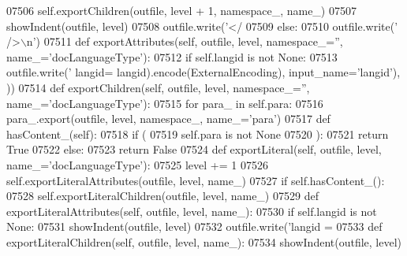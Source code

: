 \begin{DoxyCode}
{{{{{{{{{{{{{{{{{{{{{{{{{{{{{{{{{{{{{{{{{{{{{{{{{{{{{{{{{{{{{{{{{{{{{{{{{{{{{{{{{{{{{{{{{{{{{{{{{{{{{{{{{{{{{{{{{{{{{{{{{{{{{{{{{{{{{{{{{{{{{{{{{{{{{{{{{{{{{{{{{{{{{{{{{{{{{{{{{{{{{{{{{{{{{{{{{{{{{{{{{{{{{{{{{{{{{{{{{{{{{{{{{{{{{{{{{{{{{{{{{{{{{{{{{{{{{{{{{{{{{{{{{{{{{{{{{{{{{{{{{{{{{{{{{{{{{{{{{{{{{{{{{{{{{{{{{{{{{{{{{{{{{{{{{{{{{{{{{{{{{{{{{{{{{{{{{{{{{{{{{{{{{{{{{{{{{{{{{{{{{{{{{{{{{{{{{{{{{{{{{{{{{{{{{{{{{{{{{{{{{{{{{{{{{{{{{{{{{{{{{{{{{{{{{{{{{{{{{{{{{{{{{{{{{{{07506             self.exportChildren(outfile, level + 1, namespace\_, name\_)
07507             showIndent(outfile, level)
07508             outfile.write(\textcolor{stringliteral}{'</%
07509         \textcolor{keywordflow}{else}:
07510             outfile.write(\textcolor{stringliteral}{' />\(\backslash\)n'})
07511     \textcolor{keyword}{def }exportAttributes(self, outfile, level, namespace\_='', name\_='docLanguageType'):
07512         \textcolor{keywordflow}{if} self.langid \textcolor{keywordflow}{is} \textcolor{keywordflow}{not} \textcolor{keywordtype}{None}:
07513             outfile.write(\textcolor{stringliteral}{' langid=%
      langid).encode(ExternalEncoding), input\_name=\textcolor{stringliteral}{'langid'}), ))
07514     \textcolor{keyword}{def }exportChildren(self, outfile, level, namespace\_='', name\_='docLanguageType'):
07515         \textcolor{keywordflow}{for} para\_ \textcolor{keywordflow}{in} self.para:
07516             para\_.export(outfile, level, namespace\_, name\_=\textcolor{stringliteral}{'para'})
07517     \textcolor{keyword}{def }hasContent_(self):
07518         \textcolor{keywordflow}{if} (
07519             self.para \textcolor{keywordflow}{is} \textcolor{keywordflow}{not} \textcolor{keywordtype}{None}
07520             ):
07521             \textcolor{keywordflow}{return} \textcolor{keyword}{True}
07522         \textcolor{keywordflow}{else}:
07523             \textcolor{keywordflow}{return} \textcolor{keyword}{False}
07524     \textcolor{keyword}{def }exportLiteral(self, outfile, level, name\_='docLanguageType'):
07525         level += 1
07526         self.exportLiteralAttributes(outfile, level, name\_)
07527         \textcolor{keywordflow}{if} self.hasContent_():
07528             self.exportLiteralChildren(outfile, level, name\_)
07529     \textcolor{keyword}{def }exportLiteralAttributes(self, outfile, level, name\_):
07530         \textcolor{keywordflow}{if} self.langid \textcolor{keywordflow}{is} \textcolor{keywordflow}{not} \textcolor{keywordtype}{None}:
07531             showIndent(outfile, level)
07532             outfile.write(\textcolor{stringliteral}{'langid = %
07533     \textcolor{keyword}{def }exportLiteralChildren(self, outfile, level, name\_):
07534         showIndent(outfile, level)
}}}}}}}}}}}}}}}}}}}}}}}}}}}}}}}}}}}}}}}}}}}}}}}}}}}}}}}}}}}}}}}}}}}}}}}}}}}}}}}}}}}}}}}}}}}}}}}}}}}}}}}}}}}}}}}}}}}}}}}}}}}}}}}}}}}}}}}}}}}}}}}}}}}}}}}}}}}}}}}}}}}}}}}}}}}}}}}}}}}}}}}}}}}}}}}}}}}}}}}}}}}}}}}}}}}}}}}}}}}}}}}}}}}}}}}}}}}}}}}}}}}}}}}}}}}}}}}}}}}}}}}}}}}}}}}}}}}}}}}}}}}}}}}}}}}}}}}}}}}}}}}}}}}}}}}}}}}}}}}}}}}}}}}}}}}}}}}}}}}}}}}}}}}}}}}}}}}}}}}}}}}}}}}}}}}}}}}}}}}}}}}}}}}}}}}}}}}}}}}}}}}}}}}}}}}}}}}}}}}}}}}}}}}}}}}}}}}}}}}}}}}}}}}}}}}}}}}}}}}}}}}}}}}}}}}}}}
\end{DoxyCode}
